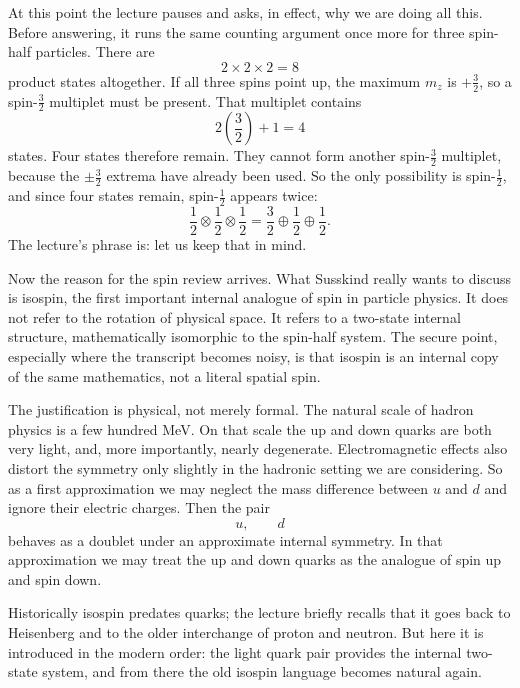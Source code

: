 At this point the lecture pauses and asks, in effect, why we are doing all this. Before answering, it runs the same counting argument once more for three spin-half particles. There are
\begin{equation}
2\times 2\times 2=8
\end{equation}
product states altogether. If all three spins point up, the maximum \(m_z\) is \(+\tfrac32\), so a spin-\(\tfrac32\) multiplet must be present. That multiplet contains
\begin{equation}
2\left(\frac32\right)+1=4
\end{equation}
states. Four states therefore remain. They cannot form another spin-\(\tfrac32\) multiplet, because the \(\pm\tfrac32\) extrema have already been used. So the only possibility is spin-\(\tfrac12\), and since four states remain, spin-\(\tfrac12\) appears twice:
\begin{equation}
\frac12\otimes\frac12\otimes\frac12
=
\frac32\oplus\frac12\oplus\frac12.
\end{equation}
The lecture's phrase is: let us keep that in mind.

Now the reason for the spin review arrives. What Susskind really wants to discuss is isospin, the first important internal analogue of spin in particle physics. It does not refer to the rotation of physical space. It refers to a two-state internal structure, mathematically isomorphic to the spin-half system. The secure point, especially where the transcript becomes noisy, is that isospin is an internal copy of the same mathematics, not a literal spatial spin.

The justification is physical, not merely formal. The natural scale of hadron physics is a few hundred MeV. On that scale the up and down quarks are both very light, and, more importantly, nearly degenerate. Electromagnetic effects also distort the symmetry only slightly in the hadronic setting we are considering. So as a first approximation we may neglect the mass difference between \(u\) and \(d\) and ignore their electric charges. Then the pair
\[
u,\qquad d
\]
behaves as a doublet under an approximate internal symmetry. In that approximation we may treat the up and down quarks as the analogue of spin up and spin down.

Historically isospin predates quarks; the lecture briefly recalls that it goes back to Heisenberg and to the older interchange of proton and neutron. But here it is introduced in the modern order: the light quark pair provides the internal two-state system, and from there the old isospin language becomes natural again.

